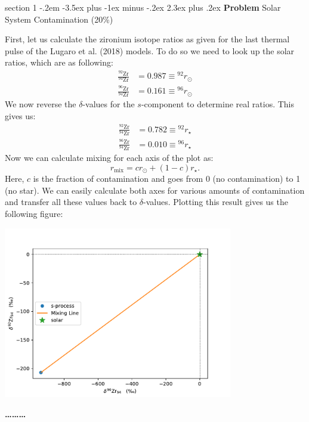 \documentclass[letterpaper,12pt,twoside=false,DIV=11]{scrartcl}
\makeatletter
\newenvironment{problem}{\@startsection
    {section}
    {1}
    {-.2em}
    {-3.5ex plus -1ex minus -.2ex}
    {2.3ex plus .2ex}
    {
        \pagebreak[3] %
        \noindent\sffamily\bfseries Problem
    }
}
{
    \begin{center}\large\bfseries\ldots\ldots\ldots\end{center}
}
\makeatother
\begin{document}
\begin{problem}{Solar System Contamination (20\%)}

First, let us calculate the zironium isotope ratios as given for the last thermal pulse of the Lugaro et al. (2018) models. To do so we need to look up the solar ratios, which are as following:
\begin{align}
    \frac{^{92}\mathrm{Zr}}{^{94}\mathrm{Zr}} &= 0.987 \equiv {^{92}}r_{\odot}\\
    \frac{^{96}\mathrm{Zr}}{^{94}\mathrm{Zr}} &= 0.161 \equiv {^{96}}r_{\odot}
\end{align}
We now reverse the $\delta$-values for the $s$-component to determine real ratios. This gives us:
\begin{align}
    \frac{^{92}\mathrm{Zr}}{^{94}\mathrm{Zr}} &= 0.782 \equiv {^{92}}r_{\star}\\
    \frac{^{96}\mathrm{Zr}}{^{94}\mathrm{Zr}} &= 0.010 \equiv {^{96}}r_{\star}
\end{align}
Now we can calculate mixing for each axis of the plot as:
\begin{equation}
    r_\mathrm{mix} = cr_\odot + (1-c)r_\star.
\end{equation}
Here, $c$ is the fraction of contamination and goes from 0 (no contamination) to 1 (no star). We can easily calculate both axes for various amounts of contamination and transfer all these values back to $\delta$-values. Plotting this result gives us the following figure:
\begin{center}
    \includegraphics[width=0.75\textwidth]{mixing_line}
\end{center}


\end{problem}
\end{document}
